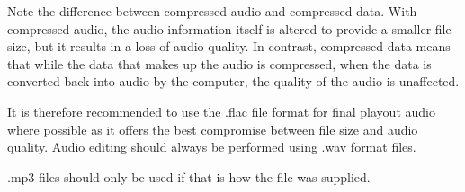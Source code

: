 Note the difference between compressed audio and compressed data. With
compressed audio, the audio information itself is altered to provide a
smaller file size, but it results in a loss of audio quality. In
contrast, compressed data means that while the data that makes up the
audio is compressed, when the data is converted back into audio by the
computer, the quality of the audio is unaffected.

It is therefore recommended to use the .flac file format for final
playout audio where possible as it offers the best compromise between
file size and audio quality. Audio editing should always be performed
using .wav format files.

.mp3 files should only be used if that is how the file was supplied.

% 
